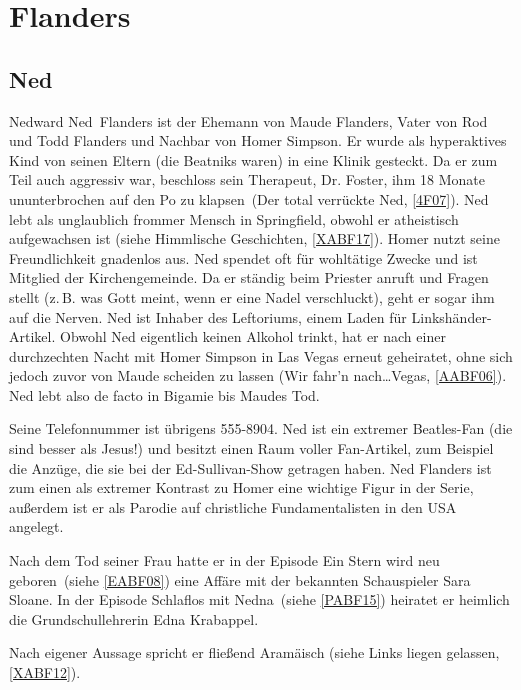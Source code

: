 \section{Flanders}

\subsection{Ned}\label{NedFlanders}
Nedward \glqq Ned\grqq\ Flanders ist der Ehemann von Maude Flanders, Vater von Rod und Todd Flanders und Nachbar von Homer Simpson. Er wurde als hyperaktives Kind von seinen Eltern (die Beatniks waren) in eine Klinik gesteckt. Da er zum Teil auch aggressiv war, beschloss sein Therapeut, Dr. Foster, ihm 18 Monate ununterbrochen auf den Po zu \glqq klapsen\grqq\ (\glqq Der total verrückte Ned\grqq , \ref{4F07}). Ned lebt als unglaublich frommer Mensch in Springfield, obwohl er atheistisch aufgewachsen ist (siehe \glqq Himmlische Geschichten\grqq, \ref{XABF17}). Homer nutzt seine Freundlichkeit gnadenlos aus. Ned spendet oft für wohltätige Zwecke und ist Mitglied der Kirchengemeinde. Da er ständig beim Priester anruft und Fragen stellt (z.\,B. was Gott meint, wenn er eine Nadel verschluckt), geht er sogar ihm auf die Nerven. Ned ist Inhaber des Leftoriums, einem Laden für Linkshänder-Artikel. Obwohl Ned eigentlich keinen Alkohol trinkt, hat er nach einer durchzechten Nacht mit Homer Simpson in Las Vegas erneut geheiratet, ohne sich jedoch zuvor von Maude scheiden zu lassen (\glqq Wir fahr'n nach\dots Vegas\grqq , \ref{AABF06}). Ned lebt also de facto in Bigamie bis Maudes Tod. 

Seine Telefonnummer ist übrigens 555-8904. Ned ist ein extremer Beatles-Fan (\glqq die sind besser als Jesus!\grqq ) und besitzt einen Raum voller Fan-Artikel, zum Beispiel die Anzüge, die sie bei der Ed-Sullivan-Show getragen haben.
Ned Flanders ist zum einen als extremer Kontrast zu Homer eine wichtige Figur in der Serie, außerdem ist er als Parodie auf christliche Fundamentalisten in den USA angelegt.

Nach dem Tod seiner Frau hatte er in der Episode \glqq Ein Stern wird neu geboren\grqq\ (siehe \ref{EABF08}) eine Affäre mit der bekannten Schauspieler Sara Sloane. In der Episode \glqq Schlaflos mit Nedna\grqq\ (siehe \ref{PABF15}) heiratet er heimlich die Grundschullehrerin Edna Krabappel.

Nach eigener Aussage spricht er fließend Aramäisch (siehe \glqq Links liegen gelassen\grqq, \ref{XABF12}).

